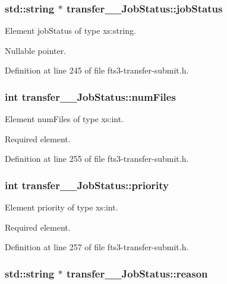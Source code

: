 \subsubsection[{jobStatus}]{\setlength{\rightskip}{0pt plus 5cm}std::string $\ast$ {\bf transfer\_\-\_\-JobStatus::jobStatus}}\label{classtransfer____JobStatus_a7ed5dedbffd7ae5c141b5de6a9220b07}


Element jobStatus of type xs:string. 

Nullable pointer. 

Definition at line 245 of file fts3-\/transfer-\/submit.h.

\subsubsection[{numFiles}]{\setlength{\rightskip}{0pt plus 5cm}int {\bf transfer\_\-\_\-JobStatus::numFiles}}\label{classtransfer____JobStatus_a969570f12524471b1d9a7dbc30daf7e6}


Element numFiles of type xs:int. 

Required element. 

Definition at line 255 of file fts3-\/transfer-\/submit.h.

\subsubsection[{priority}]{\setlength{\rightskip}{0pt plus 5cm}int {\bf transfer\_\-\_\-JobStatus::priority}}\label{classtransfer____JobStatus_a458195eec1320d9c94b3f2a36183b72f}


Element priority of type xs:int. 

Required element. 

Definition at line 257 of file fts3-\/transfer-\/submit.h.

\subsubsection[{reason}]{\setlength{\rightskip}{0pt plus 5cm}std::string $\ast$ {\bf transfer\_\-\_\-JobStatus::reason}}\label{classtransfer____JobStatus_aa9c0c83f99ebff125f9852cbb24b40aa}


